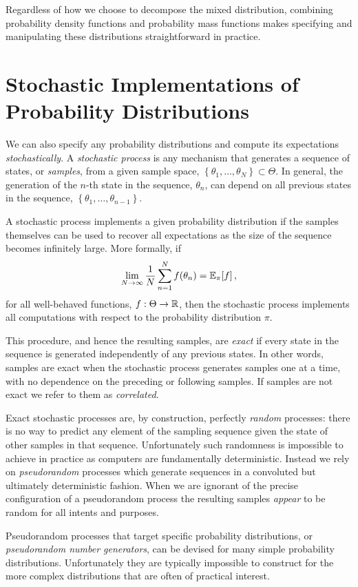Regardless of how we choose to decompose the mixed distribution,
combining probability density functions and probability mass functions
makes specifying and manipulating these distributions straightforward in
practice.

\section{Stochastic Implementations of Probability Distributions}

We can also specify any probability distributions and compute its
expectations \emph{stochastically}.  A \emph{stochastic process} is 
any mechanism that generates a sequence of states, or \emph{samples},
from a given sample space, 
$\left\{ \theta_{1}, \ldots, \theta_{N} \right\} \subset \Theta$.  In general,
the generation of the $n$-th state in the sequence, $\theta_{n}$, can
depend on all previous states in the sequence, 
$\left\{ \theta_{1}, \ldots, \theta_{n - 1} \right\}$.

A stochastic process implements a given probability distribution if 
the samples themselves can be used to recover all expectations as 
the size of the sequence becomes infinitely large. More formally, if
%
\begin{equation*}
\lim_{N \rightarrow \infty} \frac{1}{N} 
\sum_{n = 1}^{N} f \! \left( \theta_{n} \right)
= \mathbb{E}_{\pi} \! \left[ f \right],
\end{equation*}
%
for all well-behaved functions, $f : \Theta \rightarrow \mathbb{R}$, then the 
stochastic process implements all computations with respect to the 
probability distribution $\pi$.

This procedure, and hence the resulting samples, are \emph{exact} 
if every state in the sequence is generated independently of any previous 
states.  In other words, samples are exact when the stochastic process 
generates samples one at a time, with no dependence on the preceding 
or following samples.  If samples are not exact we refer to them as 
\emph{correlated}.

Exact stochastic processes are, by construction, perfectly
\emph{random} processes: there is no way to predict any element 
of the sampling sequence given the state of other samples in
that sequence.  Unfortunately such randomness is impossible to 
achieve in practice as computers are fundamentally deterministic.
Instead we rely on \emph{pseudorandom} processes which
generate sequences in a convoluted but ultimately deterministic
fashion.  When we are ignorant of the precise configuration of a
pseudorandom process the resulting samples \emph{appear} to be
random for all intents and purposes.

Pseudorandom processes that target specific probability distributions, 
or \emph{pseudorandom number generators}, can be devised for 
many simple probability distributions.  Unfortunately they are typically 
impossible to construct for the more complex distributions that are
often of practical interest.